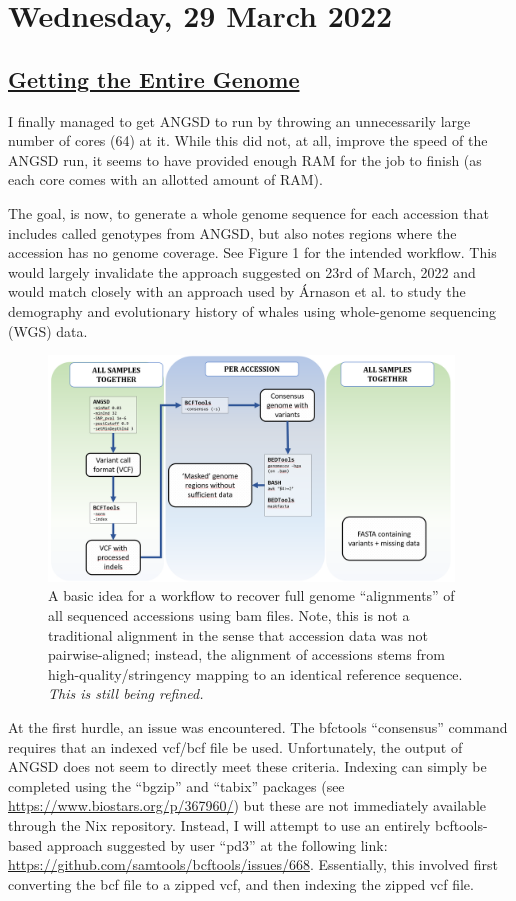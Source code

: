 \documentclass[12pt]{report}
\begin{document}
\section*{Wednesday, 29 March 2022}
\subsection*{\underline{Getting the Entire Genome}}

I finally managed to get ANGSD to run by throwing an unnecessarily large number of cores (64) at it. While this did not, at all, improve the speed of the ANGSD run, it seems to have provided enough RAM for the job to finish (as each core comes with an allotted amount of RAM).

The goal, is now, to generate a whole genome sequence for each accession that includes called genotypes from ANGSD, but also notes regions where the accession has no genome coverage. See Figure 1 for the intended workflow. This would largely invalidate the approach suggested on 23rd of March, 2022 and would match closely with an approach used by \'Arnason et al. \cite{arnason2018} to study the demography and evolutionary history of whales using whole-genome sequencing (WGS) data.

\begin{figure}[!h]
        \centering
        \includegraphics[height=6cm]{Images/alignment_workflow.PNG}
        \caption{A basic idea for a workflow to recover full genome ``alignments'' of all sequenced accessions using bam files. Note, this is not a traditional alignment in the sense that accession data was not pairwise-aligned; instead, the alignment of accessions stems from high-quality/stringency mapping to an identical reference sequence. \emph{This is still being refined.}}
\end{figure}

At the first hurdle, an issue was encountered. The bfctools ``consensus'' command requires that an indexed vcf/bcf file be used. Unfortunately, the output of ANGSD does not seem to directly meet these criteria. Indexing can simply be completed using the ``bgzip'' and ``tabix'' packages (see \url{https://www.biostars.org/p/367960/}) but these are not immediately available through the Nix repository. Instead, I will attempt to use an entirely bcftools-based approach suggested by user ``pd3'' at the following link: \url{https://github.com/samtools/bcftools/issues/668}. Essentially, this involved first converting the bcf file to a zipped vcf, and then indexing the zipped vcf file.
\end{document}
